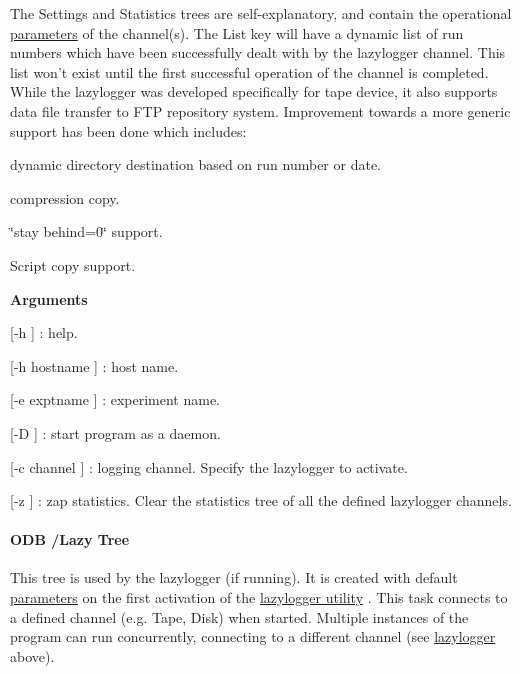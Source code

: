 The Settings and Statistics trees are self-\/explanatory, and contain the operational \hyperlink{structparameters}{parameters} of the channel(s). The List key will have a dynamic list of run numbers which have been successfully dealt with by the lazylogger channel. This list won't exist until the first successful operation of the channel is completed. \label{F_LogUtil_idx_FTP_channel_lazylogger}
\hypertarget{F_LogUtil_idx_FTP_channel_lazylogger}{}
 While the lazylogger was developed specifically for tape device, it also supports data file transfer to FTP repository system. Improvement towards a more generic support has been done which includes:
\begin{DoxyItemize}
\item dynamic directory destination based on run number or date.
\item compression copy.
\item \char`\"{}stay behind=0\char`\"{} support.
\item Script copy support.
\end{DoxyItemize}


\begin{DoxyItemize}
\item {\bfseries  Arguments }
\begin{DoxyItemize}
\item \mbox{[}-\/h \mbox{]} : help.
\item \mbox{[}-\/h hostname \mbox{]} : host name.
\item \mbox{[}-\/e exptname \mbox{]} : experiment name.
\item \mbox{[}-\/D \mbox{]} : start program as a daemon.
\item \mbox{[}-\/c channel \mbox{]} : logging channel. Specify the lazylogger to activate.
\item \mbox{[}-\/z \mbox{]} : zap statistics. Clear the statistics tree of all the defined lazylogger channels.
\end{DoxyItemize}
\end{DoxyItemize}

\par


\par


\label{F_LogUtil_ODB_tree_Lazy}
\hypertarget{F_LogUtil_ODB_tree_Lazy}{}
 \hypertarget{F_LogUtil_F_ODB_Lazy_Tree}{}\paragraph{ODB /Lazy Tree}\label{F_LogUtil_F_ODB_Lazy_Tree}
This tree is used by the lazylogger (if running). It is created with default \hyperlink{structparameters}{parameters} on the first activation of the \hyperlink{F_LogUtil_F_lazylogger_utility}{lazylogger utility} . This task connects to a defined channel (e.g. Tape, Disk) when started. Multiple instances of the program can run concurrently, connecting to a different channel (see \hyperlink{F_LogUtil_F_lazylogger_utility}{lazylogger} above).

